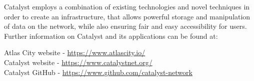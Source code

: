 Catalyst employs a combination of existing technologies and novel techniques in order to create an infrastructure, that allows powerful storage and manipulation of data on the network, while also ensuring fair and easy accessibility for users.  \\

Further information on Catalyst and its applications can be found at: \\
\begin{center}
Atlas City website - \url{https://www.atlascity.io/} \\
Catalyst website - \url{https://www.catalystnet.org/}\\
Catalyst GitHub - \url{https://www.github.com/catalyst-network}\\
\end{center}